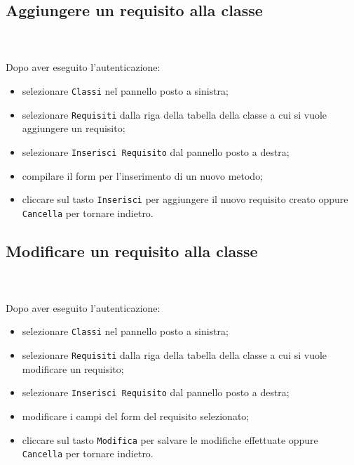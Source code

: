 	\subsection{Aggiungere un requisito alla classe} \mbox{}\\ \mbox{}\\
	Dopo aver eseguito l'autenticazione:
	\begin{itemize}
		\item selezionare \texttt{Classi} nel pannello posto a sinistra;
		\item selezionare \texttt{Requisiti} dalla riga della tabella della 
		classe
		a cui si vuole aggiungere un requisito;
		\item selezionare \texttt{Inserisci Requisito} dal pannello posto a 
		destra;
		\item compilare il form per l'inserimento di un nuovo metodo;
		\item cliccare sul tasto \texttt{Inserisci} per aggiungere il nuovo 
		requisito 
		creato oppure \texttt{Cancella} per tornare indietro.	
	\end{itemize}
	
	\subsection{Modificare un requisito alla classe} \mbox{}\\ \mbox{}\\
	Dopo aver eseguito l'autenticazione:
	\begin{itemize}
		\item selezionare \texttt{Classi} nel pannello posto a sinistra;
		\item selezionare \texttt{Requisiti} dalla riga della tabella della 
		classe
		a cui si vuole modificare un requisito;
		\item selezionare \texttt{Inserisci Requisito} dal pannello posto a 
		destra;
		\item modificare i campi del form del requisito selezionato;
		\item cliccare sul tasto \texttt{Modifica} per salvare le modifiche 
		effettuate
		oppure \texttt{Cancella} per tornare indietro.
	\end{itemize}
	
